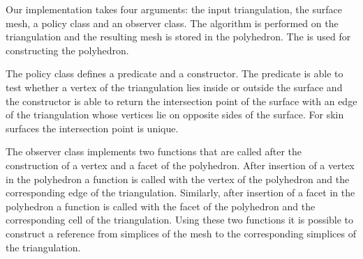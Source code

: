 Our implementation takes four arguments: the input triangulation, the
surface mesh, a policy class and an observer class.  The algorithm is
performed on the triangulation and the resulting mesh is stored in the
polyhedron. The  is used
for constructing the polyhedron.

The policy class defines a predicate and a constructor. The predicate
is able to test whether a vertex of the triangulation lies inside or
outside the surface and the constructor is able to return the
intersection point of the surface with an edge of the triangulation
whose vertices lie on opposite sides of the surface. For skin surfaces
the intersection point is unique.

The observer class implements two functions that are called after the
construction of a vertex and a facet of the polyhedron. After
insertion of a vertex in the polyhedron a function is called with the
vertex of the polyhedron and the corresponding edge of the
triangulation. Similarly, after insertion of a facet in the polyhedron
a function is called with the facet of the polyhedron and the
corresponding cell of the triangulation. Using these two functions it
is possible to construct a reference from simplices of the mesh to the
corresponding simplices of the triangulation.



